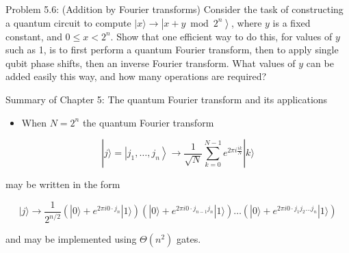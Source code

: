 Problem 5.6: (Addition by Fourier transforms) Consider the task of constructing a quantum circuit to compute $|x\rangle \rightarrow\left|x+y \bmod 2^{n}\right\rangle$, where $y$ is a fixed constant, and $0 \leq x<2^{n}$. Show that one efficient way to do this, for values of $y$ such as 1, is to first perform a quantum Fourier transform, then to apply single qubit phase shifts, then an inverse Fourier transform. What values of $y$ can be added easily this way, and how many operations are required?

Summary of Chapter 5: The quantum Fourier transform and its applications

\begin{itemize}
    \item When $N=2^{n}$ the quantum Fourier transform
\end{itemize}

\begin{equation}
    |j\rangle=\left|j_{1}, \ldots, j_{n}\right\rangle \longrightarrow \frac{1}{\sqrt{N}} \sum_{k=0}^{N-1} e^{2 \pi i \frac{i k}{N}}|k\rangle \tag{5.81}
\end{equation}

may be written in the form

\begin{equation}
    |j\rangle \rightarrow \frac{1}{2^{n / 2}}\left(|0\rangle+e^{2 \pi i 0 \cdot j_{n}}|1\rangle\right)\left(|0\rangle+e^{2 \pi i 0 \cdot j_{n-1} j_{n}}|1\rangle\right) \ldots\left(|0\rangle+e^{2 \pi i 0 \cdot j_{1} j_{2} \ldots j_{n}}|1\rangle\right) \tag{5.82}
\end{equation}

and may be implemented using $\Theta\left(n^{2}\right)$ gates.

